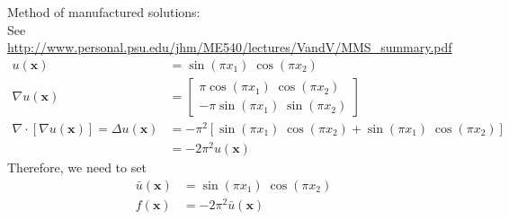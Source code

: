 \documentclass[11pt]{exam}
\begin{document}
\begin{questions}

\begin{solution}
Method of manufactured solutions:\\
See \url{http://www.personal.psu.edu/jhm/ME540/lectures/VandV/MMS_summary.pdf}
\begin{align*}
u(\mathbf{x}) 
 &= \sin(\pi x_{1}) \; \cos(\pi x_{2}) \\
\nabla u(\mathbf{x}) 
 &=\begin{bmatrix}
 \pi \cos(\pi x_{1}) \; \cos(\pi x_{2}) \\
 -\pi \sin(\pi x_{1}) \; \sin(\pi x_{2})
 \end{bmatrix} \\
\nabla \cdot \left[ \nabla u(\mathbf{x}) \right]
  = \Delta u(\mathbf{x})  
 &= -\pi^{2} \left[ \sin(\pi x_{1}) \; \cos(\pi x_{2}) + \sin(\pi x_{1}) \; \cos(\pi x_{2}) \right] \\
 &= -2\pi^{2} u(\mathbf{x}) 
\end{align*}
Therefore, we need to set 
\begin{align*}
\bar{u}(\mathbf{x}) &= \sin(\pi x_{1}) \; \cos(\pi x_{2}) \\
f(\mathbf{x}) &= -2\pi^{2} \bar{u}(\mathbf{x}) 
\end{align*}
\end{solution}



\end{questions}
\end{document}

